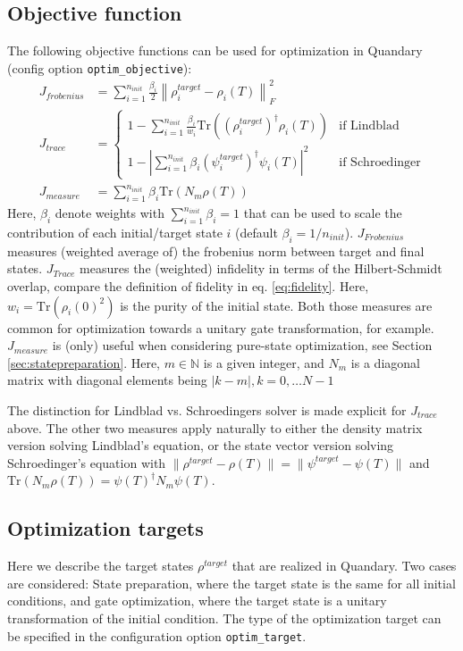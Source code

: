 \documentclass[11pt]{article}
\newcommand{\N}{\mathds{N}}
\begin{document}
\subsection{Objective function}\label{sec:objectivefunctionals}
The following objective functions can be used for optimization in Quandary (config option \texttt{optim\_objective}):
\begin{align}
 J_{frobenius} &= \sum_{i=1}^{n_{init}} \frac{\beta_i}{2} \left\| \rho^{target}_i - \rho_i(T)\right\|^2_F \\ 
 J_{trace} &= 
\begin{cases} 
 1 - \sum_{i=1}^{n_{init}} \frac{\beta_i}{w_i} \mbox{Tr}\left((\rho^{target}_i)^\dagger\rho_i(T)\right) & \text{if Lindblad}\\
 1 - \left|\sum_{i=1}^{n_{init}} \beta_i (\psi^{target}_i)^\dagger\psi_i(T)\right|^2 & \text{if Schroedinger}
\end{cases}\\
 J_{measure} &= \sum_{i=1}^{n_{init}} \beta_i \mbox{Tr} \left( N_m \rho(T) \right) \label{eq:Jmeasure} 
\end{align}
Here, $\beta_i$ denote weights with $\sum_{i=1}^{n_{init}} \beta _i = 1$ that can be used to scale the contribution of each initial/target state $i$ (default $\beta_i = 1/n_{init}$). 
$J_{Frobenius}$ measures (weighted average of) the frobenius norm between target and final states. $J_{Trace}$ measures the (weighted) infidelity in terms of the Hilbert-Schmidt overlap, compare the definition of fidelity in eq. \eqref{eq:fidelity}. Here, $w_i = \mbox{Tr}\left(\rho_i(0)^2\right)$ is the purity of the initial state. Both those measures are common for optimization towards a unitary gate transformation, for example. $J_{measure}$ is (only) useful when considering pure-state optimization, see Section \ref{sec:statepreparation}. Here, $m\in\N$ is a given integer, and $N_m$ is a diagonal matrix with diagonal elements being $|k-m|, k=0,\dots N-1$ 

The distinction for Lindblad vs. Schroedingers solver is made explicit for $J_{trace}$ above. The other two measures apply naturally to either the density matrix version solving Lindblad's equation, or the state vector version solving Schroedinger's equation with $ \|\rho^{target} - \rho(T)\| = \|\psi^{target} - \psi(T)\|$ and $\mbox{Tr}\left(N_m\rho(T)\right) = \psi(T)^\dagger N_m \psi(T)$. 



\subsection{Optimization targets} \label{sec:targets}
Here we describe the target states $\rho^{target}$ that are realized in Quandary. Two cases are considered: State preparation, where the target state is the same for all initial conditions, and gate optimization, where the target state is a unitary transformation of the initial condition. The type of the optimization target can be specified in the configuration option \texttt{optim\_target}. 
\end{document}
